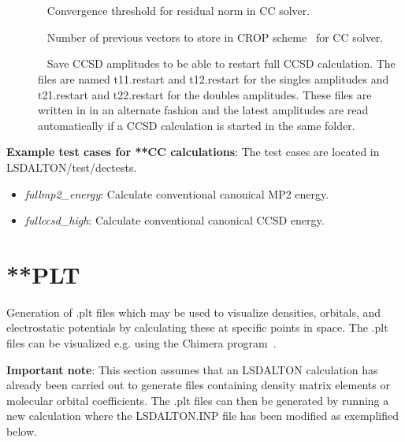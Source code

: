 \begin{description}
\item[]  \verb| | \newline
Convergence threshold for residual norm in CC solver.


\item[]  \verb| | \newline
Number of previous vectors to store in CROP scheme~\cite{crop} for CC solver.

\item[]  \verb| | \newline
Save CCSD amplitudes to be able to restart full CCSD calculation. The files are named t11.restart and t12.restart for the singles amplitudes and t21.restart and t22.restart for the doubles amplitudes. These files are written in in an alternate fashion and the latest amplitudes are read automatically if a CCSD calculation is started in the same folder.

\end{description}


\vspace{1 cm}
\noindent
\textbf{Example test cases for **CC calculations}: \newline
The test cases are located in LSDALTON/test/dectests.

\begin{itemize}
\item
\textit{fullmp2\_energy}: Calculate conventional canonical MP2 energy.
\item
\textit{fullccsd\_high}: Calculate conventional canonical CCSD energy.
\end{itemize}





\section{**PLT}\label{sec:plt}
Generation of .plt files which may be used to visualize densities, orbitals, and electrostatic potentials by calculating these at specific points in space.
The .plt files can be visualized e.g. using the Chimera program~\cite{chimera}.

\textbf{Important note}: This section assumes that an LSDALTON calculation has already been carried out to generate files containing
density matrix elements or molecular orbital coefficients. The .plt files can then be generated by running a new calculation where the LSDALTON.INP file has been modified as exemplified below.

